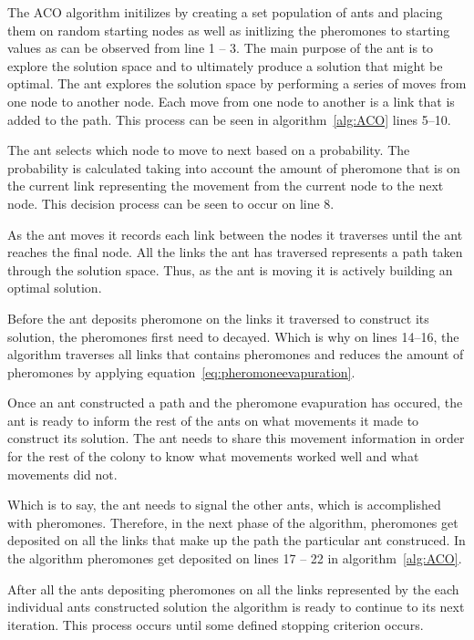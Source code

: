 The ACO algorithm initilizes by creating a set population of ants and placing them on random starting nodes as well as initlizing the pheromones to starting values as can be observed from line 1 -- 3. The main purpose of the ant is to explore the solution space and to ultimately produce a solution that might be optimal. The ant explores the solution space by performing a series of moves from one node to another node. Each move from one node to another is a link that is added to the path. This process can be seen in algorithm~\ref{alg:ACO} lines 5--10.

The ant selects which node to move to next based on a probability. The probability is calculated taking into account the amount of pheromone that is on the current link representing the movement from the current node to the next node\cite{CompuIntelligenceIntro,FundamentalSwarm}. This decision process can be seen to occur on line 8.

As the ant moves it records each link between the nodes it traverses until the ant reaches the final node. All the links the ant has traversed represents a path taken through the solution space\cite{CompuIntelligenceIntro,FundamentalSwarm}. Thus, as the ant is moving it is actively building an optimal solution.

Before the ant deposits pheromone on the links it traversed to construct its solution, the pheromones first need to decayed. Which is why on lines 14--16, the algorithm traverses all links that contains pheromones and reduces the amount of pheromones by applying equation~\ref{eq:pheromoneevapuration}.

Once an ant constructed a path and the pheromone evapuration has occured, the ant is ready to inform the rest of the ants on what movements it made to construct its solution. The ant needs to share this movement information in order for the rest of the colony to know what movements worked well and what movements did not.

Which is to say, the ant needs to signal the other ants, which is accomplished with pheromones. Therefore, in the next phase of the algorithm, pheromones get deposited on all the links that make up the path the particular ant construced. In the algorithm pheromones get deposited on lines 17 -- 22 in algorithm~\ref{alg:ACO}.

After all the ants depositing pheromones on all the links represented by the each individual ants constructed solution the algorithm is ready to continue to its next iteration. This process occurs until some defined stopping criterion occurs.

